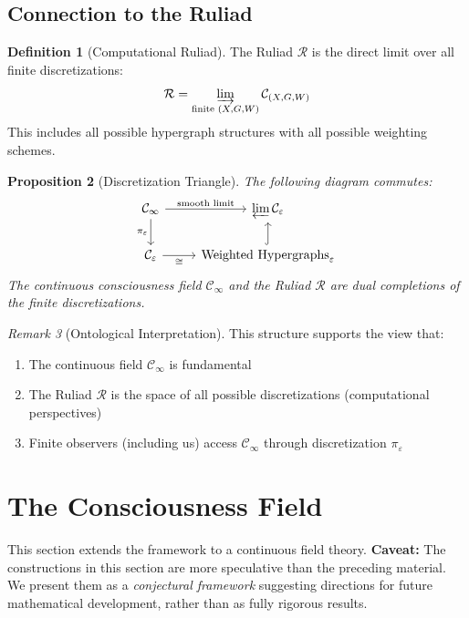 \documentclass[11pt,a4paper]{article}
\theoremstyle{definition}
\newtheorem{definition}{Definition}[section]
\theoremstyle{plain}
\newtheorem{proposition}[definition]{Proposition}
\theoremstyle{remark}
\newtheorem{remark}[definition]{Remark}
\begin{document}
\subsection{Connection to the Ruliad}

\begin{definition}[Computational Ruliad]
The Ruliad $\mathcal{R}$ is the direct limit over all finite discretizations:
\[
\mathcal{R} = \varinjlim_{\text{finite } (X, G, W)} \mathcal{C}_{(X, G, W)}
\]
This includes all possible hypergraph structures with all possible weighting schemes.
\end{definition}

\begin{proposition}[Discretization Triangle]
The following diagram commutes:
\[
\begin{tikzcd}
\mathcal{C}_\infty \arrow[d, "\pi_\varepsilon"'] \arrow[r, "\text{smooth limit}"] & \varprojlim \mathcal{C}_\varepsilon \\
\mathcal{C}_\varepsilon \arrow[r, "\cong"'] & \text{Weighted Hypergraphs}_\varepsilon \arrow[u, hook]
\end{tikzcd}
\]
The continuous consciousness field $\mathcal{C}_\infty$ and the Ruliad $\mathcal{R}$ are dual completions of the finite discretizations.
\end{proposition}

\begin{remark}[Ontological Interpretation]
This structure supports the view that:
\begin{enumerate}
    \item The continuous field $\mathcal{C}_\infty$ is fundamental
    \item The Ruliad $\mathcal{R}$ is the space of all possible discretizations (computational perspectives)
    \item Finite observers (including us) access $\mathcal{C}_\infty$ through discretization $\pi_\varepsilon$
\end{enumerate}
\end{remark}

\section{The Consciousness Field}\label{sec:field}

This section extends the framework to a continuous field theory. \textbf{Caveat:} The constructions in this section are more speculative than the preceding material. We present them as a \emph{conjectural framework} suggesting directions for future mathematical development, rather than as fully rigorous results.
\end{document}
